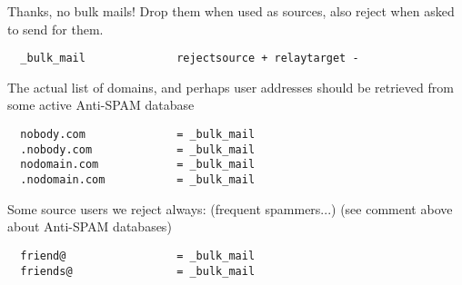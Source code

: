 Thanks, no bulk mails! Drop them when used as sources, also reject
when asked to send for them.

\begin{verbatim}
  _bulk_mail              rejectsource + relaytarget -
\end{verbatim}

The actual list of domains, and perhaps user addresses should
be retrieved from some active Anti-SPAM database

\begin{verbatim}
  nobody.com              = _bulk_mail
  .nobody.com             = _bulk_mail
  nodomain.com            = _bulk_mail
  .nodomain.com           = _bulk_mail
\end{verbatim}

Some source users we reject always: (frequent spammers...)
(see comment above about Anti-SPAM databases)

\begin{verbatim}
  friend@                 = _bulk_mail
  friends@                = _bulk_mail
\end{verbatim}
